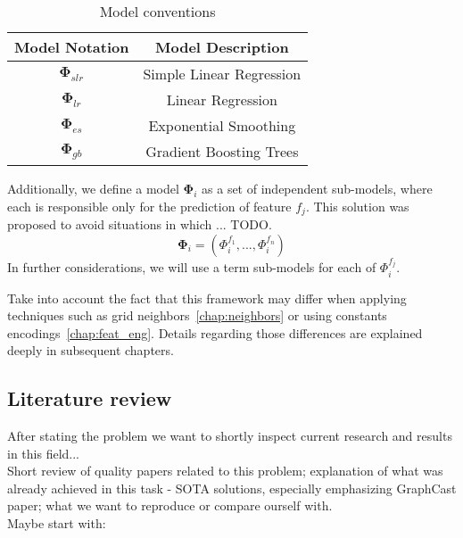 
\begin{table}[!h]
    \centering
    \begin{tabular}{|c|c|}
        \hline
        Model Notation & Model Description \\
        \hline
        $\mathbf{\Phi}_{slr}$ & Simple Linear Regression \\
        $\mathbf{\Phi}_{lr}$  & Linear Regression \\
        $\mathbf{\Phi}_{es}$  & Exponential Smoothing \\
        $\mathbf{\Phi}_{gb}$ & Gradient Boosting Trees \\
        \hline
    \end{tabular}
\caption{Model conventions}
\end{table}
 
 
 \noindent Additionally, we define a model $\mathbf{\Phi}_i$ as a set of independent sub-models, where each is responsible only for the prediction of feature $f_j$. This solution was proposed to avoid situations in which ... TODO.
 \[
 \mathbf{\Phi}_{i} = (\Phi_{i}^{f_1}, ..., \Phi_{i}^{f_n})
 \]
 In further considerations, we will use a term sub-models for each of $\Phi_{i}^{f_j}$.



\noindent Take into account the fact that this framework may differ when applying techniques such as grid neighbors~\ref{chap:neighbors} or using constants encodings~\ref{chap:feat_eng}. Details regarding those differences are explained deeply in subsequent chapters.

 \newpage
 
 \subsection{Literature review}
 After stating the problem we want to shortly inspect current research and results in this field... \\
Short review of quality papers related to this problem; explanation of what was already achieved in this task - SOTA solutions, especially emphasizing GraphCast paper; what we want to reproduce or compare ourself with. \\
\noindent Maybe start with: ~\cite{WFConsiderations}

